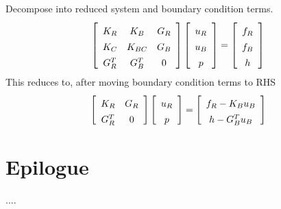\documentclass[]{svjour3}
\def\beq{\begin{equation}}
\def\eeq{\end{equation}}
\begin{document}
Decompose into reduced system and boundary condition terms.
\beq
   \left[\begin{array}{ccc}
       K_R & K_B    & G_R \rule{0pt}{13pt}\\
       K_C & K_{BC}  & G_B \rule{0pt}{13pt}\\
       G_R^T & G_B^T & 0 \rule{0pt}{13pt}
   \end{array}\right]
   \left[\begin{array}{c}
u_R  \rule{0pt}{13pt}\\
u_B  \rule{0pt}{13pt}\\
p   \rule{0pt}{13pt}
\end{array}
\right] 
=
\left[\begin{array}{c}
f_R \rule{0pt}{13pt}\\
f_B \rule{0pt}{13pt}\\
h   \rule{0pt}{13pt}
\end{array}
\right]
\eeq
This reduces to, after moving boundary condition terms to RHS
\beq
   \left[\begin{array}{cc}
       K_R   & G_R \rule{0pt}{13pt}\\
       G_R^T & 0 \rule{0pt}{13pt}
   \end{array}\right]
   \left[\begin{array}{c}
u_R  \rule{0pt}{13pt}\\
p   \rule{0pt}{13pt}
\end{array}
\right] 
=
\left[\begin{array}{c}
f_R -K_B u_B\rule{0pt}{13pt}\\
h   -G_B^T u_B\rule{0pt}{13pt}
\end{array}
\right]
\eeq
\section{Epilogue}

\begin{acknowledgements}

 ....

\end{acknowledgements}




\end{document}
